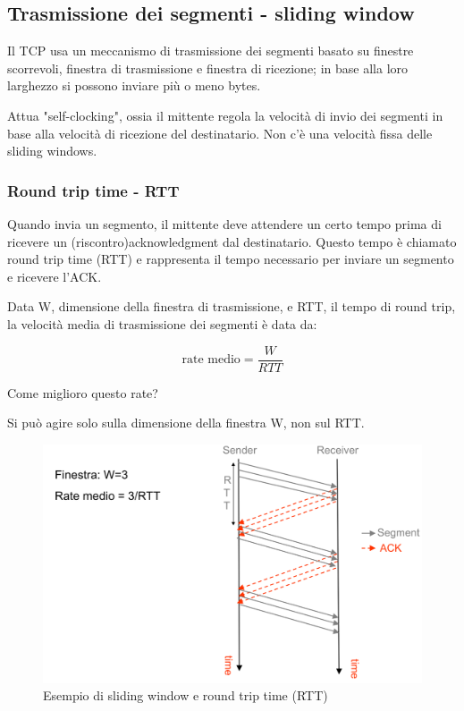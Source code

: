 \subsection{Trasmissione dei segmenti - sliding window}
Il TCP usa un meccanismo di trasmissione dei segmenti basato su finestre scorrevoli, finestra di trasmissione e finestra di ricezione; in base alla loro larghezzo si possono inviare più o meno bytes.

Attua "self-clocking", ossia il mittente regola la velocità di invio dei segmenti in base alla velocità di ricezione del destinatario. Non c'è una velocità fissa delle sliding windows.

 \subsubsection{Round trip time - RTT}
Quando invia un segmento, il mittente deve attendere un certo tempo prima di ricevere un (riscontro)acknowledgment dal destinatario. Questo tempo è chiamato round trip time (RTT) e rappresenta il tempo necessario per inviare un segmento e ricevere l'ACK.
 
Data W, dimensione della finestra di trasmissione, e RTT, il tempo di round trip, la velocità media di trasmissione dei segmenti è data da:

\begin{equation}
    \text{rate medio} = \frac{W}{RTT}
\end{equation}

Come miglioro questo rate? 

Si può agire solo sulla dimensione della finestra W, non sul RTT.

\begin{figure}[h!]
    \centering
    \includegraphics[width=1\textwidth]{images/rttsliding.png}
    \caption{Esempio di sliding window e round trip time (RTT)}
    \label{fig:rttsliding}
\end{figure}
\newpage

